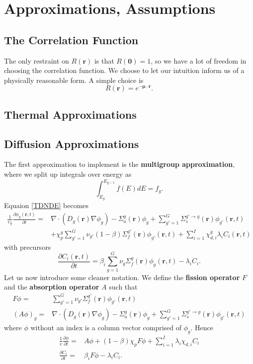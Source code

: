 \documentclass[12pt]{article}
\begin{document}
\section{Approximations, Assumptions}
\subsection{The Correlation Function}
The only restraint on $R(\mathbf{r})$ is that $R(\mathbf{0})=1$, so we have a lot of freedom in choosing the correlation function. We choose to let our intuition inform us of a physically reasonable form. A simple choice is 
\begin{equation}
    R(\mathbf{r})=e^{-\boldsymbol{\mu} \cdot \mathbf{r}}.
\end{equation}

\subsection{Thermal Approximations}

\subsection{Diffusion Approximations}
The first approximation to implement is the \textbf{multigroup approximation}, where we split up integrals over energy as 
\begin{equation}
    \int_{E_g}^{E_{g-1}}f(E)dE=f_g .
\end{equation}
Equaion \eqref{TDNDE} becomes 
\begin{align}
    \frac{1}{\upsilon_g}\frac{\partial \phi_g(\mathbf{r},t)}{\partial t}=& \nabla \cdot (D_g(\mathbf{r})\nabla \phi_g)-\Sigma^g_a(\mathbf{r})\phi_g+\sum_{g'=1}^G\Sigma_s^{g'\rightarrow g}(\mathbf{r}) \phi_{g'}(\mathbf{r},t) \\& +\chi_p ^g \sum_{g'=1}^G \nu_{g'} (1-\beta)\Sigma_f^{g'}(\mathbf{r})\phi_{g'}(\mathbf{r},t)+\sum_{i=1}^I \chi_{d,i}^g \lambda_i C_i (\mathbf{r},t)
\end{align}
with precursors
\begin{equation}
    \frac{\partial C_i(\mathbf{r},t)}{\partial t}=\beta_i \sum_{g=1}^G \nu_g \Sigma_f^g(\mathbf{r})\phi_g(\mathbf{r},t)- \lambda_i C_i.
\end{equation}
Let us now introduce some cleaner notation. We define the \textbf{fission operator} $F$ and the \textbf{absorption operator} $A$ such that 
\begin{align}
    F\phi=&\sum_{g'=1}^G \nu_{g'} \Sigma_f^{g'}(\mathbf{r})\phi_{g'}(\mathbf{r},t) \\
    (A\phi)_g =&\nabla \cdot (D_g(\mathbf{r})\nabla \phi_g)-\Sigma^g_a(\mathbf{r})\phi_g+\sum_{g'=1}^G\Sigma_s^{g'\rightarrow g}(\mathbf{r}) \phi_{g'}(\mathbf{r},t) 
\end{align}
where $\phi$ without an index is a column vector comprised of $\phi_g$. Hence 
\begin{align}
    \frac{1}{\upsilon} \frac{\partial \phi}{\partial t}=&A\phi+(1-\beta)\chi_p F\phi+\sum_{i=1}^{I}\lambda_i \chi_{d,i}C_i \\
    \frac{\partial C_i}{\partial t} =&\beta_i F \phi -\lambda_i C_i.
\end{align}
\end{document}
